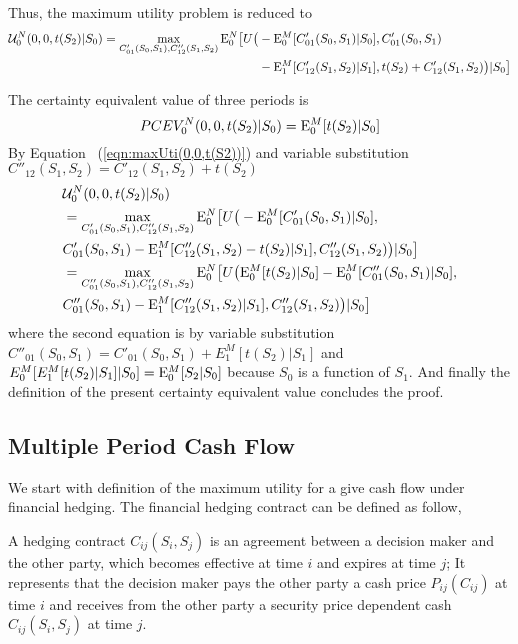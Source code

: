 Thus, the maximum utility problem is reduced to
\begin{align} \label{eqn:maxUti(0,0,t(S2))}
\mathcal{U}^N_0 (0,0, t(S_2)|S_0)\nonumber = \max_{C'_{01}(S_0,S_1),C''_{12}(S_1,S_2)} \mathrm{E}_0^N \big{[}U\big{(} &- \mathrm{E}_0^M[C'_{01}(S_0,S_1)|S_0] , C'_{01}(S_0,S_1) \\ &
- \mathrm{E}_1^M[C'_{12}(S_1,S_2)|S_1], t(S_2)+C'_{12}(S_1,S_2)\big{)} |S_0\big{]} 
\end{align}


{\lemma The certainty equivalent value of three periods is
\[PCEV_0^N(0,0,t(S_2)|S_0) = \mathrm{E}_0^M[t(S_2)|S_0] \]
}
\proof By Equation~ (\ref{eqn:maxUti(0,0,t(S2))}) and variable substitution $C''_{12}(S_1,S_2) = C'_{12}(S_1,S_2) + t(S_2)$
\begin{align*}
&\mathcal{U}^N_0 (0,0, t(S_2)|S_0)\nonumber \\&= \max_{C'_{01}(S_0,S_1),C''_{12}(S_1,S_2)} \mathrm{E}_0^N \big{[}U\big{(} - \mathrm{E}_0^M[C'_{01}(S_0,S_1)|S_0] ,\\& C'_{01}(S_0,S_1) - \mathrm{E}_1^M[C''_{12}(S_1,S_2)-t(S_2)|S_1], C''_{12}(S_1,S_2)\big{)} |S_0\big{]} \\
& = \max_{C''_{01}(S_0,S_1),C''_{12}(S_1,S_2)} \mathrm{E}_0^N \big{[}U\big{(} \mathrm{E}_0^M[t(S_2)|S_0]- \mathrm{E}_0^M[C''_{01}(S_0,S_1)|S_0] , \\&C''_{01}(S_0,S_1) - \mathrm{E}_1^M[C''_{12}(S_1,S_2)|S_1], C''_{12}(S_1,S_2)\big{)} |S_0\big{]}
\end{align*}
where the second equation is by variable substitution $C''_{01}(S_0,S_1) = C'_{01}(S_0,S_1) + E_1^M[t(S_2)|S_1]$ and $E_0^M[E_1^M[t(S_2)|S_1]|S_0] = \mathrm{E}_0^M[S_2|S_0]$ because $S_0$ is a function of $S_1$.  And finally the definition of the present certainty equivalent value concludes the proof.
\endproof

\subsection{Multiple Period Cash Flow}
We start with definition of the maximum utility for a give cash flow under financial hedging.  The financial hedging contract can be defined as follow,

{ A hedging contract $C_{ij}(S_i,S_j)$ is an agreement between a decision maker and the other party, which becomes effective at time $i$ and expires at time $j$; It represents that the decision maker pays the other party a  cash price $P_{ij}(C_{ij})$ at time $i$ and receives from the other party a security price dependent cash $C_{ij}(S_i,S_j)$ at time $j$.  }


